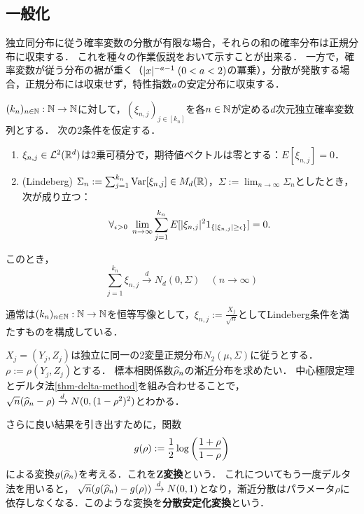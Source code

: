 \documentclass[uplatex,dvipdfmx]{jsreport}
\begin{document}
\subsection{一般化}

\begin{tcolorbox}[colframe=ForestGreen, colback=ForestGreen!10!white,breakable,colbacktitle=ForestGreen!40!white,coltitle=black,fonttitle=\bfseries\sffamily,
title=]
    独立同分布に従う確率変数の分散が有限な場合，それらの和の確率分布は正規分布に収束する．
    これを種々の作業仮説をおいて示すことが出来る．
    一方で，確率変数が従う分布の裾が重く（$\lvert x\rvert^{-a-1}\;(0<a<2)$の冪乗），分散が発散する場合，正規分布には収束せず，特性指数$a$の安定分布に収束する．
\end{tcolorbox}

\begin{theorem}
    $(k_n)_{n\in\mathbb{N}}:\mathbb{N}\to\mathbb{N}$に対して，$(\xi_{n,j})_{j\in[k_n]}$を各$n\in\mathbb{N}$が定める$d$次元独立確率変数列とする．
    次の2条件を仮定する．
    \begin{enumerate}[({A}1)]
        \item $\xi_{n,j}\in\mathcal{L}^2(\mathbb{R}^d)$は2乗可積分で，期待値ベクトルは零とする：$E[\xi_{n,j}]=0$．
        \item (Lindeberg) $\Sigma_n:=\sum^{k_n}_{j=1}\mathrm{Var}[\xi_{n,j}]\in M_d(\mathbb{R})$，$\Sigma:=\lim_{n\to\infty}\Sigma_n$としたとき，次が成り立つ：
        \[\forall_{\epsilon>0}\;\lim_{n\to\infty}\sum^{k_n}_{j=1}E[\lvert\xi_{n,j}\rvert^21_{\left\{\lvert\xi_{n,j}\rvert\ge\epsilon\right\}}]=0.\]
    \end{enumerate}
    このとき，
    \[\sum^{k_n}_{j=1}\xi_{n,j}\xrightarrow{d}N_d(0,\Sigma)\quad(n\to\infty)\]
\end{theorem}
\begin{remarks}
    通常は$(k_n)_{n\in\mathbb{N}}:\mathbb{N}\to\mathbb{N}$を恒等写像として，$\xi_{n,j}:=\frac{X_j}{\sqrt{n}}$としてLindeberg条件を満たすものを構成している．
\end{remarks}

\begin{example}
    $X_j=(Y_j,Z_j)$は独立に同一の2変量正規分布$N_2(\mu,\Sigma)$に従うとする．$\rho:=\rho(Y_j,Z_j)$とする．
    標本相関係数$\widehat{\rho}_n$の漸近分布を求めたい．
    中心極限定理とデルタ法\ref{thm-delta-method}を組み合わせることで，
    $\sqrt{n}(\widehat{\rho}_n-\rho)\xrightarrow{d}N(0,(1-\rho^2)^2)$とわかる．

    さらに良い結果を引き出すために，関数
    \[g(\rho):=\frac{1}{2}\log\left(\frac{1+\rho}{1-\rho}\right)\]
    による変換$g(\widehat{\rho}_n)$を考える．これを\textbf{Z変換}という．
    これについてもう一度デルタ法を用いると，
    $\sqrt{n}(g(\widehat{\rho}_n)-g(\rho))\xrightarrow{d}N(0,1)$となり，漸近分散はパラメータ$\rho$に依存しなくなる．このような変換を\textbf{分散安定化変換}という．
\end{example}
\end{document}
